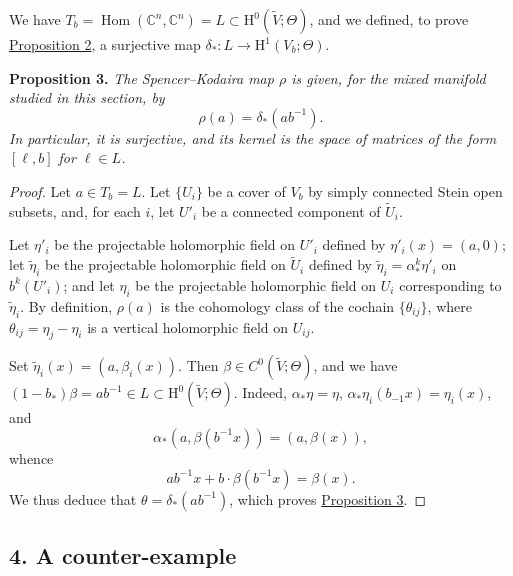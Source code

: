 \documentclass[british]{article}
\newenvironment{itenv}[1]
  {\phantomsection\par\smallskip\noindent\textbf{#1.}\itshape}
  {\par\smallskip}
\newcommand{\oldpage}[1]{\marginpar{\footnotesize$\Big\vert$ \textit{p.~#1}}}
\begin{document}
We have
\(T_b=\operatorname{Hom}(\mathbb{C}^n,\mathbb{C}^n)=L\subset\mathrm{H}^0(\widetilde{V};\Theta)\),
and we defined, to prove \hyperref[three-proposition-2]{Proposition 2},
a surjective map \(\delta_*\colon L\to\mathrm{H}^1(V_b;\Theta)\).

\protect{}\label{three-proposition-3}
\begin{itenv}{Proposition 3}
The Spencer--Kodaira map \(\rho\) is given, for the mixed manifold
studied in this section, by \[
  \rho(a) = \delta_*(ab^{-1}).
\] In particular, it is surjective, and its kernel is the space of
matrices of the form \([\ell,b]\) for \(\ell\in L\).

\end{itenv}

\begin{proof}
Let \(a\in T_b=L\). Let \(\{U_i\}\) be a cover of \(V_b\) by simply
connected Stein open subsets, and, for each \(i\), let \(U'_i\) be a
connected component of \(\widetilde{U}_i\).

Let \(\eta'_i\) be the projectable holomorphic field on \(U'_i\) defined
by \(\eta'_i(x)=(a,0)\); let \(\widetilde{\eta}_i\) be the projectable
holomorphic field on \(\widetilde{U}_i\) defined by
\(\widetilde{\eta}_i=\alpha_*^k\eta'_i\) on \(b^k(U'_i)\); and let
\(\eta_i\) be the projectable holomorphic field on \(U_i\) corresponding
to \(\widetilde{\eta}_i\). By definition, \(\rho(a)\) is the cohomology
class of the cochain \(\{\theta_{ij}\}\), where
\(\theta_{ij}=\eta_j-\eta_i\) is a vertical holomorphic field on
\(U_{ij}\). \oldpage{3-07}

Set \(\widetilde{\eta}_i(x)=(a,\beta_i(x))\). Then
\(\beta\in C^0(\widetilde{V};\Theta)\), and we have
\((1-b_*)\beta=ab^{-1}\in L\subset\mathrm{H}^0(\widetilde{V};\Theta)\).
Indeed, \(\alpha_*\eta=\eta\), \(\alpha_*\eta_i(b_{-1}x)=\eta_i(x)\),
and \[
  \alpha_*(a,\beta(b^{-1}x)) = (a,\beta(x)),
\] whence \[
  ab^{-1}x + b\cdot\beta(b^{-1}x) = \beta(x).
\] We thus deduce that \(\theta=\delta_*(ab^{-1})\), which proves
\hyperref[three-proposition-3]{Proposition 3}.
\end{proof}

\subsection*{4. A counter-example}\label{three-section-III.4}
\end{document}

